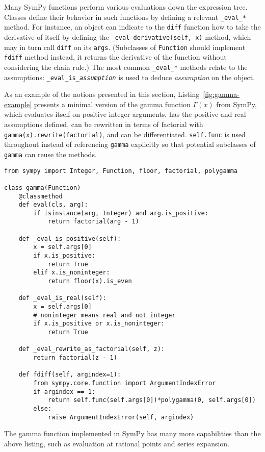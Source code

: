 Many SymPy functions perform various evaluations down the expression tree.
Classes define their behavior in such functions by defining a relevant
\verb|_eval_|\texttt{\textit{*}} method. For instance, an object can indicate
to the \texttt{diff} function how to take the derivative of itself by defining
the \verb|_eval_derivative(self, x)| method, which may in turn call
\texttt{diff} on its \texttt{args}. (Subclasses of \texttt{Function} should
implement \texttt{fdiff} method instead, it returns the derivative of the function
without considering the chain rule.) The most common
\verb|_eval_|\texttt{\textit{*}} methods relate to the assumptions:
\verb|_eval_is_|\texttt{\textit{assumption}} is used to deduce
\textit{assumption} on the object.

As an example of the notions presented in this section,
Listing~\ref{fig:gamma-example} presents a minimal version of the gamma
function $\Gamma(x)$ from SymPy, which evaluates itself on positive integer
arguments, has the positive and real assumptions defined, can be rewritten in
terms of factorial with \verb|gamma(x).rewrite(factorial)|, and can be
differentiated. \texttt{self.func} is used throughout
instead of referencing \texttt{gamma} explicitly so that potential subclasses
of \texttt{gamma} can reuse the methods.

\lstset{
  basicstyle=\ttfamily,
}

\begin{lstlisting}[caption={A minimal implementation of \texttt{sympy.gamma}.},label=fig:gamma-example]
from sympy import Integer, Function, floor, factorial, polygamma

class gamma(Function)
    @classmethod
    def eval(cls, arg):
        if isinstance(arg, Integer) and arg.is_positive:
            return factorial(arg - 1)

    def _eval_is_positive(self):
        x = self.args[0]
        if x.is_positive:
            return True
        elif x.is_noninteger:
            return floor(x).is_even

    def _eval_is_real(self):
        x = self.args[0]
        # noninteger means real and not integer
        if x.is_positive or x.is_noninteger:
            return True

    def _eval_rewrite_as_factorial(self, z):
        return factorial(z - 1)

    def fdiff(self, argindex=1):
        from sympy.core.function import ArgumentIndexError
        if argindex == 1:
            return self.func(self.args[0])*polygamma(0, self.args[0])
        else:
            raise ArgumentIndexError(self, argindex)
\end{lstlisting}
The gamma function implemented in SymPy has many more capabilities than the
above listing, such as evaluation at rational points and series expansion.
